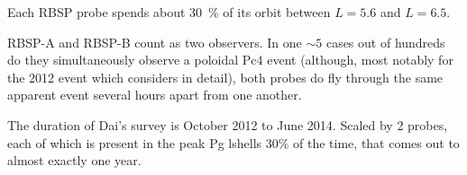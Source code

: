 
Each RBSP probe spends about \SI{30}{\percent} of its orbit between $L = 5.6$ and $L = 6.5$. 

RBSP-A and RBSP-B count as two observers. In one $\sim 5$ cases out of hundreds do they simultaneously observe a poloidal Pc4 event (although, most notably for the 2012 event which \cite{dai_2013} considers in detail), both probes do fly through the same apparent event several hours apart from one another. 

The duration of Dai's survey is October 2012 to June 2014. Scaled by 2 probes, each of which is present in the peak Pg lshells 30\% of the time, that comes out to almost exactly one year. 









